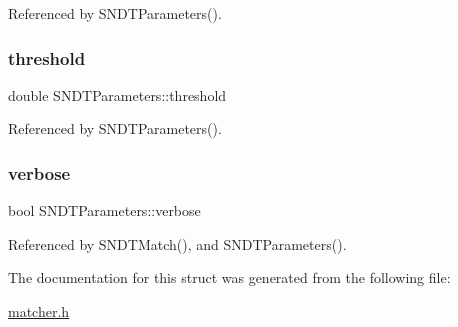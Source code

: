 Referenced by S\+N\+D\+T\+Parameters().

\mbox{\label{structSNDTParameters_a5ce655fe4db2495af244c60a643a936f}} 
\subsubsection{\texorpdfstring{threshold}{threshold}}
{\footnotesize\ttfamily double S\+N\+D\+T\+Parameters\+::threshold}



Referenced by S\+N\+D\+T\+Parameters().

\mbox{\label{structSNDTParameters_adadc231fb2773527b03959a2c8d39b25}} 
\subsubsection{\texorpdfstring{verbose}{verbose}}
{\footnotesize\ttfamily bool S\+N\+D\+T\+Parameters\+::verbose}



Referenced by S\+N\+D\+T\+Match(), and S\+N\+D\+T\+Parameters().



The documentation for this struct was generated from the following file\+:\begin{DoxyCompactItemize}
\item 
\hyperlink{matcher_8h}{matcher.\+h}\end{DoxyCompactItemize}
